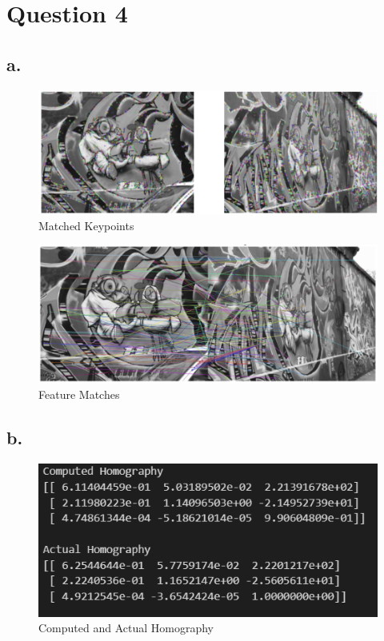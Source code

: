 \documentclass[12pt,a4paper]{article}
\begin{document}
    

\section{Question 4}

\subsection{a.}
    \begin{figure}[H]
        \centering
        \includegraphics[width=0.85\linewidth]{images/Screenshots/4_11.png}
        \caption{Matched Keypoints}
        \label{fig:enter-label}
    \end{figure}

    \begin{figure}[H]
        \centering
        \includegraphics[width=0.85\linewidth]{images/Screenshots/4_12.png}
        \caption{Feature Matches}
        \label{fig:enter-label}
    \end{figure}

\subsection{b.}
     \begin{figure}[H]
        \centering
        \includegraphics[width=0.85\linewidth]{images/Screenshots/4_2.png}
        \caption{Computed and Actual Homography}
        \label{fig:enter-label}
    \end{figure}
    
\end{document}
